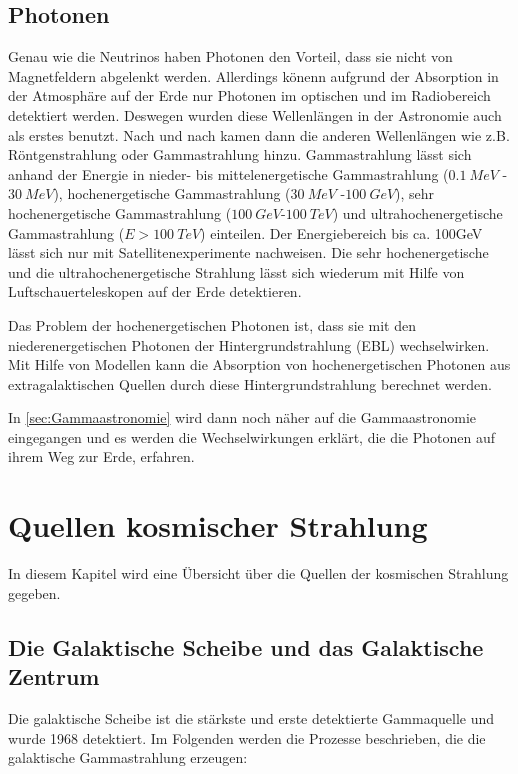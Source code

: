 \subsection{Photonen}
Genau wie die Neutrinos haben Photonen den Vorteil, dass sie nicht von Magnetfeldern abgelenkt werden.
Allerdings könenn aufgrund der Absorption in der Atmosphäre auf der Erde nur Photonen im optischen und im Radiobereich detektiert werden.
Deswegen wurden diese Wellenlängen in der Astronomie auch als erstes benutzt. 
Nach und nach kamen dann die anderen Wellenlängen wie z.B. Röntgenstrahlung oder Gammastrahlung hinzu.
Gammastrahlung lässt sich anhand der Energie in nieder- bis mittelenergetische Gammastrahlung ($\SI{0,1}{MeV}$ - $\SI{30}{MeV}$), hochenergetische Gammastrahlung ($\SI{30}{MeV}$ -$\SI{100}{GeV}$), sehr hochenergetische Gammastrahlung ($\SI{100}{GeV}$-$\SI{100}{TeV}$) und ultrahochenergetische Gammastrahlung ($E>\SI{100}{TeV}$) einteilen.
Der Energiebereich bis ca. 100GeV lässt sich nur mit Satellitenexperimente nachweisen.
Die sehr hochenergetische und die ultrahochenergetische Strahlung lässt sich wiederum mit Hilfe von Luftschauerteleskopen auf der Erde detektieren.\cite{Weekes}

Das Problem der hochenergetischen Photonen ist, dass sie mit den niederenergetischen Photonen der Hintergrundstrahlung (EBL) wechselwirken.
Mit Hilfe von Modellen kann die Absorption von hochenergetischen Photonen aus extragalaktischen Quellen durch diese Hintergrundstrahlung berechnet werden.\cite{Weekes}

In \autoref{sec:Gammaastronomie} wird dann noch näher auf die Gammaastronomie eingegangen und es werden die Wechselwirkungen erklärt, die die Photonen auf ihrem Weg zur Erde, erfahren.


\section{Quellen kosmischer Strahlung}
\label{sec:Quellen}
In diesem Kapitel wird eine Übersicht über die Quellen der kosmischen Strahlung gegeben.

\subsection{Die Galaktische Scheibe und das Galaktische Zentrum}
Die galaktische Scheibe ist die stärkste und erste detektierte Gammaquelle und wurde 1968\cite{GalacticPlane} detektiert.
Im Folgenden werden die Prozesse beschrieben, die die galaktische Gammastrahlung erzeugen:

